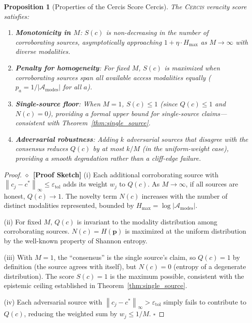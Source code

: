 \documentclass[11pt,a4paper]{article}
\newtheorem{proposition}[theorem]{Proposition}
\theoremstyle{definition}
\newcommand{\rigorSketch}[0]{$\diamond$~\textbf{[Proof Sketch]}}
\newcommand{\Cercis}{\textsc{Cercis}}
\newcommand{\norm}[1]{\left\lVert#1\right\rVert}
\begin{document}
\begin{proposition}[Properties of the Cercis Score Cercis]
\label{prop:cercis_properties}
The \Cercis{} veracity score satisfies:
\begin{enumerate}[label=(\roman*)]
    \item \textbf{Monotonicity in $M$}: $S(c)$ is non-decreasing in the number of corroborating sources, asymptotically approaching $1 + \eta \cdot H_{\max}$ as $M \to \infty$ with diverse modalities.
    \item \textbf{Penalty for homogeneity}: For fixed $M$, $S(c)$ is maximized when corroborating sources span all available access modalities equally ($p_a = 1/|\mathcal{A}_{\mathrm{modes}}|$ for all $a$).
    \item \textbf{Single-source floor}: When $M = 1$, $S(c) \leq 1$ (since $Q(c) \leq 1$ and $N(c) = 0$), providing a formal upper bound for single-source claims---consistent with Theorem~\ref{thm:single_source}.
    \item \textbf{Adversarial robustness}: Adding $k$ adversarial sources that disagree with the consensus reduces $Q(c)$ by at most $k/M$ (in the uniform-weight case), providing a smooth degradation rather than a cliff-edge failure.
\end{enumerate}
\end{proposition}

\begin{proof}\rigorSketch
(i) Each additional corroborating source with $\norm{c_j - c^*}_\infty \leq \varepsilon_{\mathrm{tol}}$ adds its weight $w_j$ to $Q(c)$. As $M \to \infty$, if all sources are honest, $Q(c) \to 1$. The novelty term $N(c)$ increases with the number of distinct modalities represented, bounded by $H_{\max} = \log |\mathcal{A}_{\mathrm{modes}}|$.

(ii) For fixed $M$, $Q(c)$ is invariant to the modality distribution among corroborating sources. $N(c) = H(\mathbf{p})$ is maximized at the uniform distribution by the well-known property of Shannon entropy.

(iii) With $M = 1$, the ``consensus'' is the single source's claim, so $Q(c) = 1$ by definition (the source agrees with itself), but $N(c) = 0$ (entropy of a degenerate distribution). The score $S(c) = 1$ is the maximum possible, consistent with the epistemic ceiling established in Theorem~\ref{thm:single_source}.

(iv) Each adversarial source with $\norm{c_j - c^*}_\infty > \varepsilon_{\mathrm{tol}}$ simply fails to contribute to $Q(c)$, reducing the weighted sum by $w_j \leq 1/M$. $\square$
\end{proof}
\end{document}
